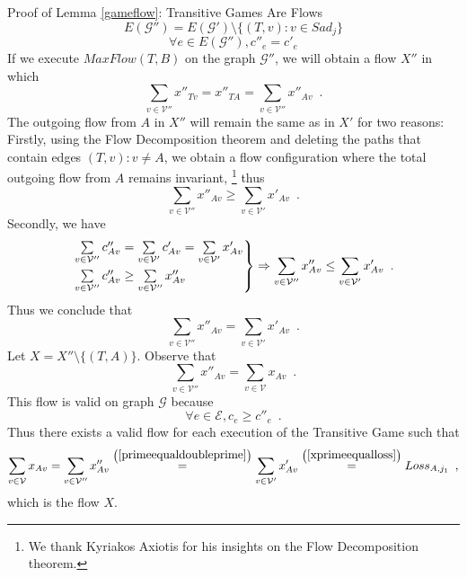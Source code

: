 \begin{sepproof}{Proof of Lemma \ref{gameflow}: Transitive Games Are Flows}
  \begin{equation*}
    E(\mathcal{G}'') = E(\mathcal{G}') \setminus \{(T, v) : v \in Sad_j\}
  \end{equation*}
  \begin{equation*}
    \forall e \in E(\mathcal{G}''), c''_e = c'_e
  \end{equation*}
  If we execute $MaxFlow(T, B)$ on the graph $\mathcal{G}''$, we will obtain a flow $X''$ in which
  \begin{equation*}
    \sum\limits_{v \in \mathcal{V}''}x''_{Tv} = x''_{TA} = \sum\limits_{v \in \mathcal{V}''}x''_{Av} \enspace.
  \end{equation*}
  The outgoing flow from $A$ in $X''$ will remain the same as in $X'$ for two reasons: Firstly, using the Flow
  Decomposition theorem \cite{amo} and deleting the paths that contain edges $\left(T, v\right): v \neq A$, we
  obtain a flow configuration where the total outgoing flow from $A$ remains invariant,
     \footnote{We thank Kyriakos Axiotis for his insights on the Flow Decomposition theorem.}
  thus
  \begin{equation*}
    \sum\limits_{v \in \mathcal{V}''}x''_{Av} \geq \sum\limits_{v \in \mathcal{V}'}x'_{Av} \enspace.
  \end{equation*}
  Secondly, we have
  \begin{equation*}
    \begin{rcases}
      \sum\limits_{v \in \mathcal{V}''}c''_{Av} = \sum\limits_{v \in \mathcal{V}'}c'_{Av} = \sum\limits_{v \in
      \mathcal{V}'}x'_{Av} \\
      \sum\limits_{v \in \mathcal{V}''}c''_{Av} \geq \sum\limits_{v \in \mathcal{V}''}x''_{Av}
    \end{rcases}
    \Rightarrow \sum\limits_{v \in \mathcal{V}''}x''_{Av} \leq \sum\limits_{v \in \mathcal{V}'}x'_{Av} \enspace.
  \end{equation*}
  Thus we conclude that
  \begin{equation}
  \label{primeequaldoubleprime}
    \sum\limits_{v \in \mathcal{V}''}x''_{Av} = \sum\limits_{v \in \mathcal{V}'}x'_{Av} \enspace.
  \end{equation}
  Let $X = X'' \setminus \{(T, A)\}$. Observe that
  \begin{equation*}
    \sum\limits_{v \in \mathcal{V}''}x''_{Av} = \sum\limits_{v \in \mathcal{V}}x_{Av} \enspace.
  \end{equation*}
  This flow is valid on graph $\mathcal{G}$ because
  \begin{equation*}
    \forall e \in \mathcal{E}, c_e \geq c''_e \enspace.
  \end{equation*}
  Thus there exists a valid flow for each execution of the Transitive Game such that
  \begin{equation*}
    \sum\limits_{v \in \mathcal{V}}x_{Av} = \sum\limits_{v \in \mathcal{V}''}x''_{Av}
    \overset{\left(\mbox{\ref{primeequaldoubleprime}}\right)}{=} \sum\limits_{v \in \mathcal{V}'}x'_{Av}
    \overset{\left(\mbox{\ref{xprimeequalloss}}\right)}{=} Loss_{A, j_1} \enspace,
  \end{equation*}
  which is the flow $X$.
\end{sepproof}

